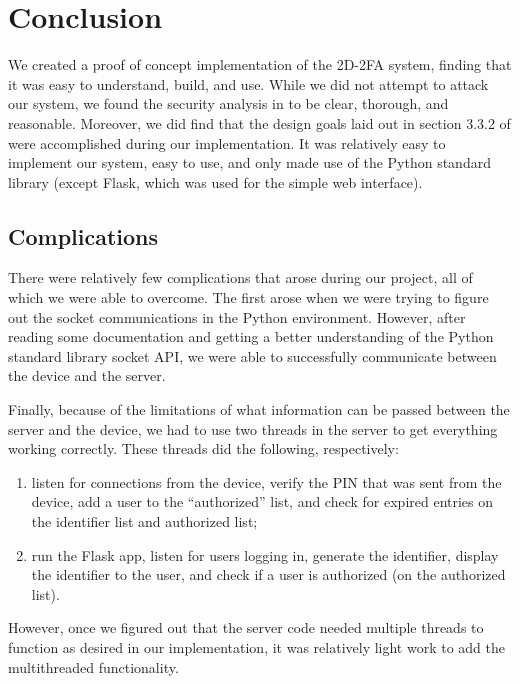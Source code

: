 \documentclass[11pt]{article}
\begin{document}
\section{Conclusion}

We created a proof of concept implementation of the 2D-2FA system,
finding that it was easy to understand, build, and use. While we did not
attempt to attack our system, we found the security analysis in
\cite{shirvanian2d2fa} to be clear, thorough, and reasonable. Moreover,
we did find that the design goals laid out in section 3.3.2 of
\cite{shirvanian2d2fa} were accomplished during our implementation. It
was relatively easy to implement our system, easy to use, and only made
use of the Python standard library (except Flask, which was used for the
simple web interface). 

\subsection{Complications}

There were relatively few complications that arose during our project,
all of which we were able to overcome. The first arose when we were
trying to figure out the socket communications in the Python
environment. However, after reading some documentation and getting a
better understanding of the Python standard library socket API, we were
able to successfully communicate between the device and the server. 

Finally, because of the limitations of what information can be passed
between the server and the device, we had to use two threads in the
server to get everything working correctly. These threads did the
following, respectively: 
\begin{enumerate}
    \item listen for connections from the device, verify the PIN that
    was sent from the device, add a user to the ``authorized'' list, and
    check for expired entries on the identifier list and authorized
    list;
    \item run the Flask app, listen for users logging in, generate the
    identifier, display the identifier to the user, and check if a user
    is authorized (on the authorized list). 
\end{enumerate}
However, once we figured out that the server code needed multiple threads to
function as desired in our implementation, it was relatively light work
to add the multithreaded functionality. 
\end{document}

